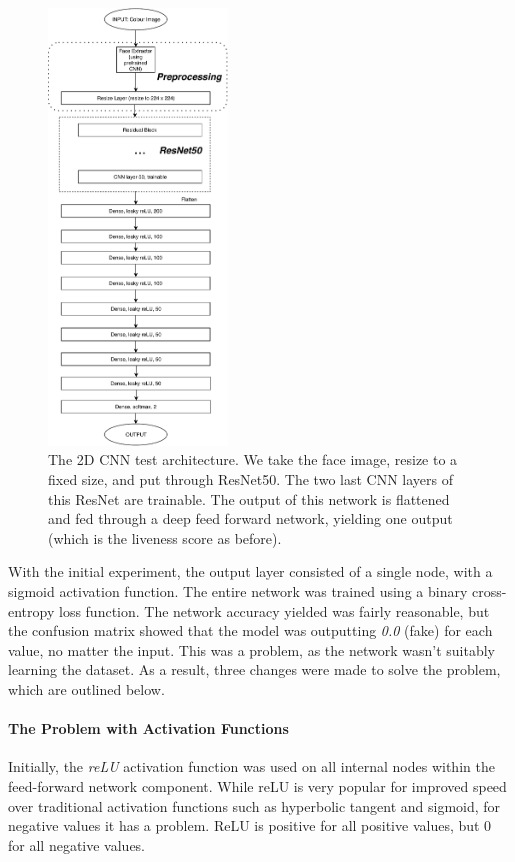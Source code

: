 \documentclass[12pt,a4paper]{article}
\begin{document}
                \begin{figure}
                    \centering
                    \includegraphics[width=180px]{2DCNNArchitecture.pdf}
                    \caption{The 2D CNN test architecture. We take the face image, resize to a fixed size, and put through ResNet50. The two last CNN layers
                    of this ResNet are trainable. The output of this network is flattened and fed through a deep feed forward network, yielding one output (which is the
                    liveness score as before).}
                    \label{2DCNNArchitecture}
                \end{figure}
                
                With the initial experiment, the output layer consisted of a single node, with a sigmoid activation function. The entire network was trained using a binary cross-entropy loss function. The network accuracy yielded was fairly reasonable,
                but the confusion matrix showed that the model was outputting \emph{0.0} (fake) for each value, no matter the input. This was a problem, as the network wasn't suitably learning the dataset. As a result, three changes were made to solve the problem, which are outlined below.
                
                \paragraph{The Problem with Activation Functions}
                Initially, the \emph{reLU} activation function was used on all internal nodes within the feed-forward network component. While reLU is very popular for improved speed over traditional activation functions such as hyperbolic tangent and sigmoid,
                for negative values it has a problem. ReLU is positive for all positive values, but 0 for all negative values.
\end{document}
